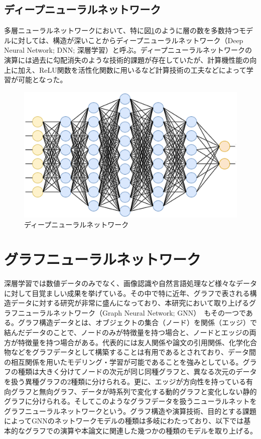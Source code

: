 \subsection{ディープニューラルネットワーク}
多層ニューラルネットワークにおいて、特に図\ref{dnn}のように層の数を多数持つモデルに対しては、構造が深いことからディープニューラルネットワーク（Deep Neural Network; DNN; 深層学習）と呼ぶ。ディープニューラルネットワークの演算には過去に勾配消失のような技術的課題が存在していたが、計算機性能の向上に加え、ReLU関数を活性化関数に用いるなど計算技術の工夫などによって学習が可能となった。
\begin{figure}[H]
	\begin{center}
 \includegraphics[keepaspectratio, scale=0.4]
 	{Figure/Deeplearning/dnn.png}
 		\caption{ディープニューラルネットワーク}
 		\label{dnn}
	\end{center}
\end{figure}
\section{グラフニューラルネットワーク}
深層学習では数値データのみでなく、画像認識や自然言語処理など様々なデータに対して目覚ましい成果を挙げている。その中で特に近年、グラフで表される構造データに対する研究が非常に盛んになっており、本研究において取り上げるグラフニューラルネットワーク（Graph Neural Network; GNN）~\cite{gnnreview}もその一つである。グラフ構造データとは、オブジェクトの集合（ノード）を関係（エッジ）で結んだデータのことで、ノードのみが特徴量を持つ場合と、ノードとエッジの両方が特徴量を持つ場合がある。代表的には友人関係や論文の引用関係、化学化合物などをグラフデータとして構築することは有用であるとされており、データ間の相互関係を用いたモデリング・学習が可能であることを強みとしている。グラフの種類は大きく分けてノードの次元が同じ同種グラフと、異なる次元のデータを扱う異種グラフの2種類に分けられる。更に、エッジが方向性を持っている有向グラフと無向グラフ、データが時系列で変化する動的グラフと変化しない静的グラフに分けられる。そしてこのようなグラフデータを扱うニューラルネットをグラフニューラルネットワークという。グラフ構造や演算技術、目的とする課題によってGNNのネットワークモデルの種類は多岐にわたっており、以下では基本的なグラフでの演算や本論文に関連した幾つかの種類のモデルを取り上げる。

